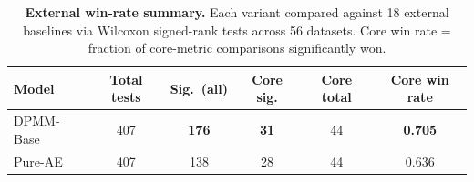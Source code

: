 \begin{table}[!htbp]
\centering
\caption{\textbf{External win-rate summary.} Each variant compared against 18 external baselines via Wilcoxon signed-rank tests across 56 datasets. Core win rate = fraction of core-metric comparisons significantly won.}
\label{tab:dpmm_external_winrate}
\begin{tabular}{lccccc}
\toprule
Model & Total tests & Sig.\ (all) & Core sig. & Core total & Core win rate \\
\midrule
DPMM-Base & 407 & \textbf{176} & \textbf{31} & 44 & \textbf{0.705} \\
Pure-AE & 407 & 138 & 28 & 44 & 0.636 \\
\bottomrule
\end{tabular}
\end{table}
